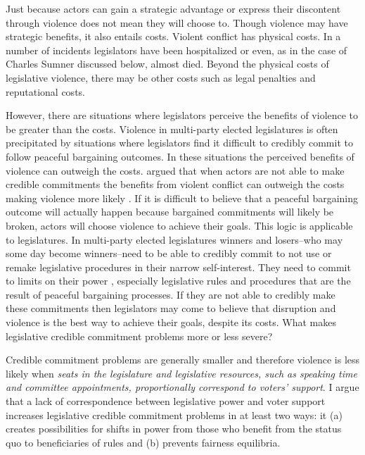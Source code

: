 \documentclass[a4paper]{article}\usepackage[]{graphicx}\usepackage[]{color}
\begin{document}
Just because actors can gain a strategic advantage or express their discontent through violence does not mean they will choose to. Though violence may have strategic benefits, it also entails costs. Violent conflict has physical costs. In a number of incidents legislators have been hospitalized or even, as in the case of Charles Sumner discussed below, almost died. Beyond the physical costs of legislative violence, there may be other costs such as legal penalties and reputational costs.

However, there are situations where legislators perceive the benefits of violence to be greater than the costs. Violence in multi-party elected legislatures is often precipitated by situations where legislators find it difficult to credibly commit to follow peaceful bargaining outcomes. In these situations the perceived benefits of violence can outweigh the costs. \cite{Fearon1995} argued that when actors are not able to make credible commitments the benefits from violent conflict can outweigh the costs making violence more likely \cite[see also][]{Powell2006}. If it is difficult to believe that a peaceful bargaining outcome will actually happen because bargained commitments will likely be broken, actors will choose violence to achieve their goals. This logic is applicable to legislatures. In multi-party elected legislatures winners and losers--who may some day become winners--need to be able to credibly commit to not use or remake legislative procedures in their narrow self-interest. They need to commit to limits on their power \citep{riker1982,Gaubatz1996}, especially legislative rules and procedures that are the result of peaceful bargaining processes. If they are not able to credibly make these commitments then legislators may come to believe that disruption and violence is the best way to achieve their goals, despite its costs. What makes legislative credible commitment problems more or less severe?

Credible commitment problems are generally smaller and therefore violence is less likely when \emph{ seats in the legislature and legislative resources, such as speaking time and committee appointments, proportionally correspond to voters' support}.  I argue that a lack of correspondence between legislative power and voter support increases legislative credible commitment problems in at least two ways: it (a) creates possibilities for shifts in power from those who benefit from the status quo to beneficiaries of  rules  and (b) prevents fairness equilibria.
\end{document}
